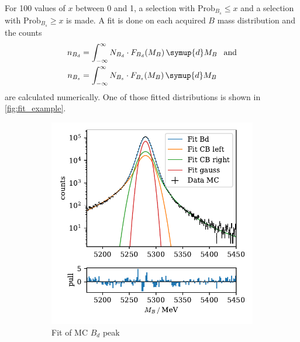 For 100 values of $x$ between 0 and 1, a selection with $\text{Prob}_{B_s} \leq x$ and a selection with $\text{Prob}_{B_s} \geq x$ is made.
A fit is done on each acquired $B$ mass distribution and the counts
\begin{align*}
    n_{B_d} &= \int_{-\infty}^{\infty} N_{B_d} \cdot F_{B_d}(M_B) \, \symup{d}M_B \:\:\text{ and} \\
    n_{B_s} &= \int_{-\infty}^{\infty} N_{B_s} \cdot F_{B_s}(M_B) \, \symup{d}M_B
\end{align*}
are calculated numerically.
One of those fitted distributions is shown in \autoref{fig:fit_example}.

\begin{figure}
    \centering
    \begin{subfigure}{0.5\textwidth}
        \centering
        \includegraphics[width=\textwidth]{images/fit_mc.pdf}
        \caption{Fit of MC $B_d$ peak}
        \label{fig:fit_mc}
    \end{subfigure}%
    \begin{subfigure}{0.5\textwidth}
        \centering

\end{subfigure}
\end{figure}
